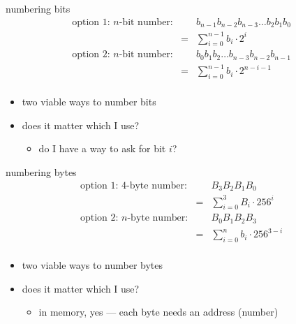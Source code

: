 
\begin{frame}{numbering bits}
\begin{eqnarray*}
\text{option 1: $n$-bit number:}&\;&b_{n-1}b_{n-2}b_{n-3}\ldots b_2b_1b_0 \\
    & = & \sum_{i=0}^{n-1} b_i \cdot 2^i \\
\text{option 2: $n$-bit number:}&\;&b_{0}b_{1}b_{2}\ldots b_{n-3}b_{n-2}b_{n-1} \\
    & = & \sum_{i=0}^{n-1} b_i \cdot 2^{n-i-1} \\
\end{eqnarray*}
\begin{itemize}
\item<2-> two viable ways to number bits
\item<3-> does it matter which I use?
    \begin{itemize}
    \item do I have a way to ask for bit $i$?
    \end{itemize}
\end{itemize}
\end{frame}

\begin{frame}{numbering bytes}
\begin{eqnarray*}
\text{option 1: 4-byte number:}&\;&B_3B_2B_1B_0 \\
    & = & \sum_{i=0}^{3} B_i \cdot 256^i \\
\text{option 2: $n$-byte number:}&\;&B_0B_1B_2B_3 \\
    & = & \sum_{i=0}^{n} b_i \cdot 256^{3-i} \\
\end{eqnarray*}
\begin{itemize}
\item<2-> two viable ways to number bytes
\item<3-> does it matter which I use?
    \begin{itemize}
    \item in memory, yes --- each byte needs an address (number)
    \end{itemize}
\end{itemize}
\end{frame}

